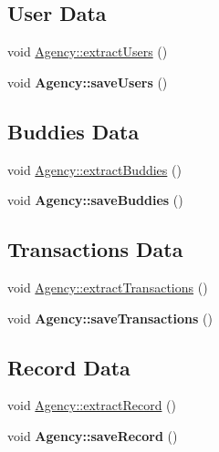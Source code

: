 \subsection*{User Data}
\begin{DoxyCompactItemize}
\item 
void \hyperlink{group___agency_ga659e4c6df03779b524f37b1c8fb5221d}{Agency\+::extract\+Users} ()
\item 
\mbox{\label{group___agency_gaf253026d4b2a377822d4e3c1ef680e6c}} 
void {\bfseries Agency\+::save\+Users} ()
\end{DoxyCompactItemize}
\subsection*{Buddies Data}
\begin{DoxyCompactItemize}
\item 
void \hyperlink{group___agency_ga93c45528d2114a557a1e0b23498e178a}{Agency\+::extract\+Buddies} ()
\item 
\mbox{\label{group___agency_ga6dc773d5c105563da2019dd062eb7918}} 
void {\bfseries Agency\+::save\+Buddies} ()
\end{DoxyCompactItemize}
\subsection*{Transactions Data}
\begin{DoxyCompactItemize}
\item 
void \hyperlink{group___agency_gadfda62c1a33db5f797098d0391e6ee87}{Agency\+::extract\+Transactions} ()
\item 
\mbox{\label{group___agency_gae72ab0970ba685c5a57360047f8a38e7}} 
void {\bfseries Agency\+::save\+Transactions} ()
\end{DoxyCompactItemize}
\subsection*{Record Data}
\begin{DoxyCompactItemize}
\item 
void \hyperlink{group___agency_ga8cafe0f0410e881f1a0d7a1bdd502058}{Agency\+::extract\+Record} ()
\item 
\mbox{\label{group___agency_gaa66b3d72d32473933366c4c4beefdb7e}} 
void {\bfseries Agency\+::save\+Record} ()
\end{DoxyCompactItemize}
